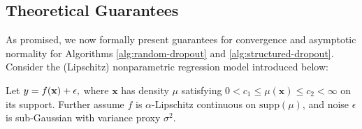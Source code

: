 
\vspace{-1ex}
\subsection{Theoretical Guarantees}
\vspace{-1ex}
\label{sec:theory}
As promised, we now formally present guarantees for convergence and asymptotic normality for Algorithms \ref{alg:random-dropout} and \ref{alg:structured-dropout}. Consider the (Lipschitz) nonparametric regression model introduced below:
\begin{aspt}
    Let \(y = f(\mathbf{x}) + \epsilon,\) where \(\mathbf{x}\) has density \(\mu\) satisfying $0 < c_1 \le \mu(\mathbf{x}) \le c_2 < \infty$ on its support. Further assume \(f\) is \(\alpha\)-Lipschitz continuous on \(\mathrm{supp}(\mu)\), and noise \(\epsilon\) is sub-Gaussian with variance proxy \(\sigma^2\).
    \label{aspt:nonparametric-regression}
\end{aspt}

\vspace{-1ex}
